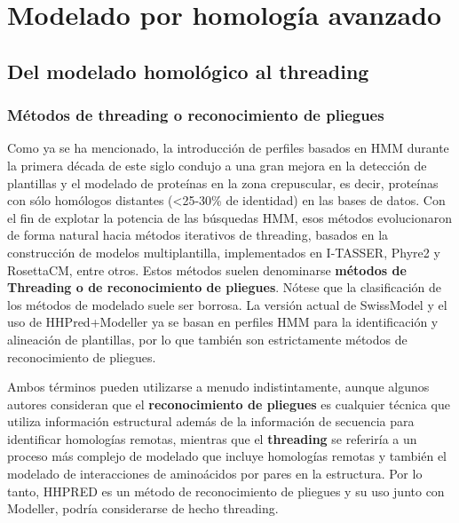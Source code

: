 \chapter{Modelado por homología avanzado}
\section{Del modelado homológico al threading}
\subsection{Métodos de threading o reconocimiento de pliegues}
Como ya se ha mencionado, la introducción de perfiles basados en HMM durante la primera década de este siglo condujo a una gran mejora en la detección de plantillas y el modelado de proteínas en la zona crepuscular, es decir, proteínas con sólo homólogos distantes (<25-30\% de identidad) en las bases de datos. Con el fin de explotar la potencia de las búsquedas HMM, esos métodos evolucionaron de forma natural hacia métodos iterativos de threading, basados en la construcción de modelos multiplantilla, implementados en I-TASSER, Phyre2 y RosettaCM, entre otros. Estos métodos suelen denominarse \textbf{métodos de Threading o de reconocimiento de pliegues}. Nótese que la clasificación de los métodos de modelado suele ser borrosa. La versión actual de SwissModel y el uso de HHPred+Modeller ya se basan en perfiles HMM para la identificación y alineación de plantillas, por lo que también son estrictamente métodos de reconocimiento de pliegues.

Ambos términos pueden utilizarse a menudo indistintamente, aunque algunos autores consideran que el \textbf{reconocimiento de pliegues} es cualquier técnica que utiliza información estructural además de la información de secuencia para identificar homologías remotas, mientras que el \textbf{threading} se referiría a un proceso más complejo de modelado que incluye homologías remotas y también el modelado de interacciones de aminoácidos por pares en la estructura. Por lo tanto, HHPRED es un método de reconocimiento de pliegues y su uso junto con Modeller, podría considerarse de hecho threading.

